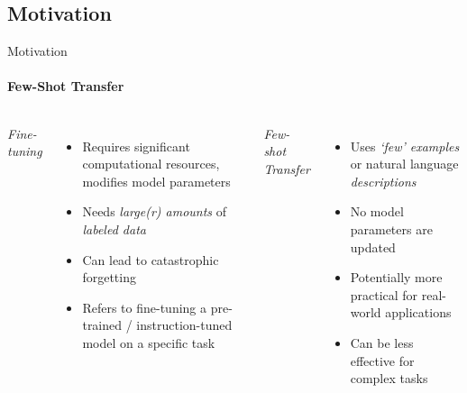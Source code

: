 \documentclass[aspectratio=169]{beamer}
\begin{document}
\subsection{Motivation}
\begin{frame}{Motivation}
\framesubtitle{Few-Shot Transfer}
  \vspace{-1em}
  \begin{columns}[T]
      \centering \emph{Fine-tuning}
      \begin{itemize}
        \item Requires significant computational resources, modifies model parameters
        \item Needs \emph{large(r) amounts} of \emph{labeled data}
        \item Can lead to catastrophic forgetting
        \item Refers to fine-tuning a pre-trained / instruction-tuned model on a specific task
      \end{itemize}
    \centering \emph{Few-shot Transfer}
    \begin{itemize}
        \item Uses \emph{`few' examples} or natural language \emph{descriptions}
        \item No model parameters are updated
        \item Potentially more practical for real-world applications~
        \item Can be less effective for complex tasks
    \end{itemize}
  \end{columns}
\end{frame}
\end{document}
